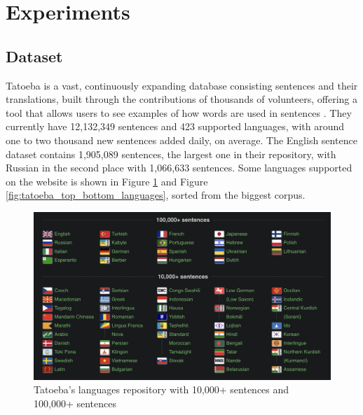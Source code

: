 \documentclass[a4paper]{article}
\begin{document}
\section{Experiments}

\subsection{Dataset}

Tatoeba is a vast, continuously expanding database consisting sentences and their translations, built through the contributions of thousands of volunteers, offering a tool that allows users to see examples of how words are used in sentences \cite{tatoeba}. They currently have 12,132,349 sentences and 423 supported languages, with around one to two thousand new sentences added daily, on average. The English sentence dataset contains 1,905,089 sentences, the largest one in their repository, with Russian in the second place with 1,066,633 sentences. Some languages supported on the website is shown in Figure \ref{fig:tatoeba_languages} and Figure \ref{fig:tatoeba_top_bottom_languages}, sorted from the biggest corpus.

\begin{figure}[htbp]
    \centering
    \includegraphics[width=0.9\linewidth]{images/tatoeba_languages.png}
    \caption{Tatoeba's languages repository with 10,000+ sentences and 100,000+ sentences \cite{tatoeba}}
    \label{fig:tatoeba_languages}
\end{figure}
\end{document}
